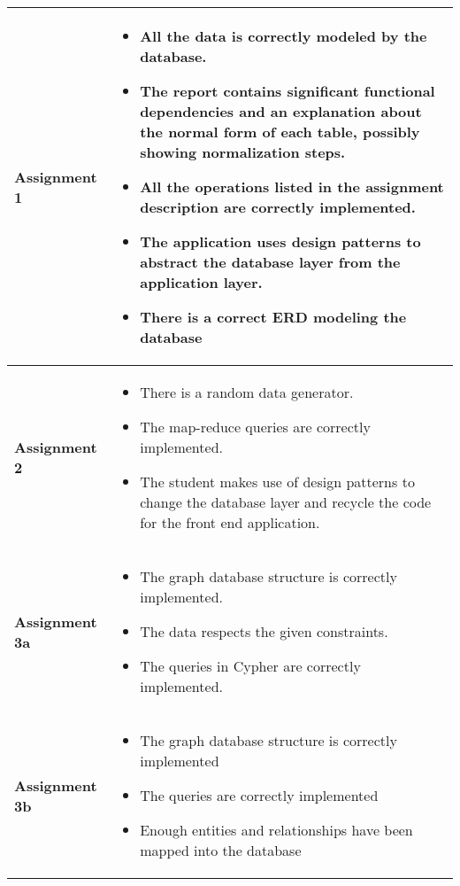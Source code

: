 		\begin{longtable}{|p{3cm}|p{8cm}|}
			\hline
			\textbf{Assignment 1} &
			\begin{itemize}
				\item All the data is correctly modeled by the database.
				\item The report contains significant functional dependencies and an explanation about the normal form of each table, possibly showing normalization steps.
				\item All the operations listed in the assignment description are correctly implemented.
				\item The application uses design patterns to abstract the database layer from the application layer.
				\item There is a correct ERD modeling the database 
			\end{itemize} \\
			\hline
			\textbf{Assignment 2} &
			\begin{itemize}
				\item There is a random data generator.
				\item The map-reduce queries are correctly implemented.
				\item The student makes use of design patterns to change the database layer and recycle the code for the front end application.
			\end{itemize} \\
			\hline
			\textbf{Assignment 3a} &
			\begin{itemize}
				\item The graph database structure is correctly implemented.
				\item The data respects the given constraints.
				\item The queries in Cypher are correctly implemented.
			\end{itemize} \\
			\hline
			\textbf{Assignment 3b} &
			\begin{itemize}
				\item The graph database structure is correctly implemented
				\item The queries are correctly implemented
				\item Enough entities and relationships have been mapped into the database
			\end{itemize}\\
			\hline
		\end{longtable}
